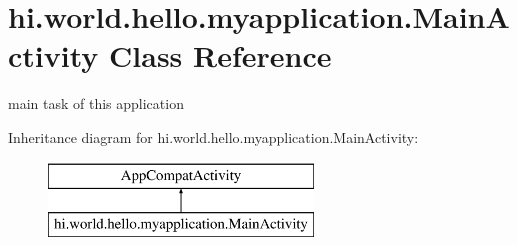 \hypertarget{classhi_1_1world_1_1hello_1_1myapplication_1_1_main_activity}{}\section{hi.\+world.\+hello.\+myapplication.\+Main\+Activity Class Reference}
\label{classhi_1_1world_1_1hello_1_1myapplication_1_1_main_activity}


main task of this application  


Inheritance diagram for hi.\+world.\+hello.\+myapplication.\+Main\+Activity\+:\begin{figure}[H]
\begin{center}
\leavevmode
\includegraphics[height=2.000000cm]{classhi_1_1world_1_1hello_1_1myapplication_1_1_main_activity}
\end{center}
\end{figure}
